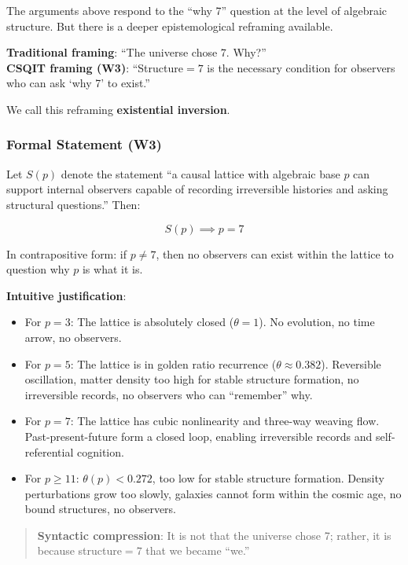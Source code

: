 \documentclass[aps,prd,twocolumn,nofootinbib,floatfix]{revtex4-2}
\begin{document}
The arguments above respond to the ``why 7'' question at the level of algebraic structure. But there is a deeper epistemological reframing available.

\textbf{Traditional framing}: ``The universe chose 7. Why?'' \\
\textbf{CSQIT framing (W3)}: ``Structure$=7$ is the necessary condition for observers who can ask `why 7' to exist.''

We call this reframing \textbf{existential inversion}.

\subsubsection{Formal Statement (W3)}

Let $S(p)$ denote the statement ``a causal lattice with algebraic base $p$ can support internal observers capable of recording irreversible histories and asking structural questions.'' Then:

\[
S(p) \implies p = 7
\]

In contrapositive form: if $p \neq 7$, then no observers can exist within the lattice to question why $p$ is what it is.

\textbf{Intuitive justification}:
\begin{itemize}
    \item For $p=3$: The lattice is absolutely closed ($\theta=1$). No evolution, no time arrow, no observers.
    \item For $p=5$: The lattice is in golden ratio recurrence ($\theta \approx 0.382$). Reversible oscillation, matter density too high for stable structure formation, no irreversible records, no observers who can ``remember'' why.
    \item For $p=7$: The lattice has cubic nonlinearity and three-way weaving flow. Past-present-future form a closed loop, enabling irreversible records and self-referential cognition.
    \item For $p \ge 11$: $\theta(p) < 0.272$, too low for stable structure formation. Density perturbations grow too slowly, galaxies cannot form within the cosmic age, no bound structures, no observers.
\end{itemize}

\begin{quote}
\textbf{Syntactic compression}: It is not that the universe chose 7; rather, it is because structure$=7$ that we became ``we.''
\end{quote}
\end{document}
